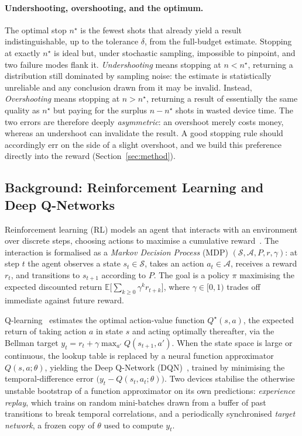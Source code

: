 \documentclass[runningheads]{llncs}
\begin{document}
\paragraph{Undershooting, overshooting, and the optimum.} The optimal stop
$n^{\star}$ is the fewest shots that already yield a result indistinguishable, up
to the tolerance $\delta$, from the full-budget estimate. Stopping at exactly
$n^{\star}$ is ideal but, under stochastic sampling, impossible to pinpoint, and
two failure modes flank it. \emph{Undershooting} means stopping at $n<n^{\star}$,
returning a distribution still dominated by sampling noise: the estimate is
statistically unreliable and any conclusion drawn from it may be invalid.
Instead, \emph{Overshooting} means stopping at $n>n^{\star}$, returning a result of essentially
the same quality as $n^{\star}$ but paying for the surplus $n-n^{\star}$ shots in
wasted device time. The two errors are therefore deeply \emph{asymmetric}: an
overshoot merely costs money, whereas an undershoot can invalidate the result.
A good stopping rule should accordingly err on the side of a slight overshoot,
and we build this preference directly into the reward (Section~\ref{sec:method}).

\subsection{Background: Reinforcement Learning and Deep Q-Networks}
\label{sec:background-dl}

Reinforcement learning (RL) models an agent that interacts with an environment
over discrete steps, choosing actions to maximise a cumulative
reward~\cite{sutton2018reinforcement}. The interaction is formalised as a
\emph{Markov Decision Process} (MDP) $(\mathcal{S},\mathcal{A},P,r,\gamma)$:
at step $t$ the agent observes a state $s_t\in\mathcal{S}$, takes an action
$a_t\in\mathcal{A}$, receives a reward $r_t$, and transitions to $s_{t+1}$
according to $P$. The goal is a policy $\pi$ maximising the expected discounted
return $\mathbb{E}\bigl[\sum_{k\ge 0}\gamma^{k} r_{t+k}\bigr]$, where
$\gamma\in[0,1)$ trades off immediate against future reward.

Q-learning~\cite{watkins1992qlearning} estimates the optimal action-value
function $Q^{\star}(s,a)$, the expected return of taking action $a$ in state $s$
and acting optimally thereafter, via the Bellman target
$y_t = r_t + \gamma\max_{a'}Q(s_{t+1},a')$. When the state space is large or
continuous, the lookup table is replaced by a neural function approximator
$Q(s,a;\theta)$, yielding the Deep Q-Network (DQN)~\cite{mnih2015human}, trained
by minimising the temporal-difference error $\bigl(y_t-Q(s_t,a_t;\theta)\bigr)$.
Two devices stabilise the otherwise unstable bootstrap of a function
approximator on its own predictions: \emph{experience replay}, which trains on
random mini-batches drawn from a buffer of past transitions to break temporal
correlations, and a periodically synchronised \emph{target network}, a frozen
copy of $\theta$ used to compute $y_t$.
\end{document}

